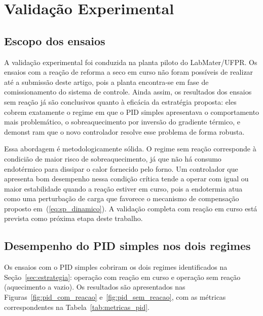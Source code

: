 
\section{Validação Experimental}
\label{sec:validacao}

\subsection{Escopo dos ensaios}

A validação experimental foi conduzida na planta piloto do LabMater/UFPR.
Os ensaios com a reação de reforma a seco em curso não foram possíveis de
realizar até a submissão deste artigo, pois a planta encontra-se em fase de
comissionamento do sistema de controle. Ainda assim, os resultados dos ensaios
sem reação já são conclusivos quanto à eficácia da estratégia proposta: eles
cobrem exatamente o regime em que o PID simples apresentava o comportamento
mais problemático, o sobreaquecimento por inversão do gradiente térmico, e
demonst ram que o novo controlador resolve esse problema de forma robusta.

Essa abordagem é metodologicamente sólida. O regime sem reação corresponde à
condicião de maior risco de sobreaquecimento, já que não há consumo
endotérmico para dissipar o calor fornecido pelo forno. Um controlador que
apresenta bom desempenho nessa condição crítica tende a operar com igual ou
maior estabilidade quando a reação estiver em curso, pois a endotermia atua
como uma perturbação de carga que favorece o mecanismo de compensação
proposto em~(\ref{eq:sp_dinamico}). A validação completa com reação em curso
está prevista como próxima etapa deste trabalho.

\subsection{Desempenho do PID simples nos dois regimes}

Os ensaios com o PID simples cobriram os dois regimes identificados na
Seção~\ref{sec:estrategia}: operação com reação em curso e operação sem
reação (aquecimento a vazio). Os resultados são apresentados nas
Figuras~\ref{fig:pid_com_reacao} e~\ref{fig:pid_sem_reacao}, com as métricas
correspondentes na Tabela~\ref{tab:metricas_pid}.

